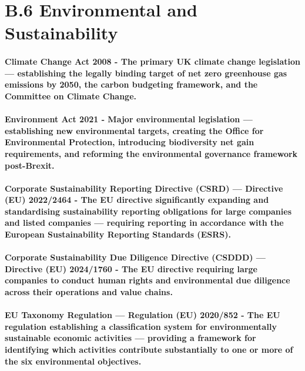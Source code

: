 \section*{B.6 Environmental and Sustainability}
\paragraph{\textbf{Climate Change Act 2008} - The primary UK climate change legislation — establishing the legally binding target of net zero greenhouse gas emissions by 2050, the carbon budgeting framework, and the Committee on Climate Change.}
\paragraph{\textbf{Environment Act 2021} - Major environmental legislation — establishing new environmental targets, creating the Office for Environmental Protection, introducing biodiversity net gain requirements, and reforming the environmental governance framework post-Brexit.}
\paragraph{\textbf{Corporate Sustainability Reporting Directive (CSRD) — Directive (EU) 2022/2464} - The EU directive significantly expanding and standardising sustainability reporting obligations for large companies and listed companies — requiring reporting in accordance with the European Sustainability Reporting Standards (ESRS).}
\paragraph{\textbf{Corporate Sustainability Due Diligence Directive (CSDDD) — Directive (EU) 2024/1760} - The EU directive requiring large companies to conduct human rights and environmental due diligence across their operations and value chains.}
\paragraph{\textbf{EU Taxonomy Regulation — Regulation (EU) 2020/852} - The EU regulation establishing a classification system for environmentally sustainable economic activities — providing a framework for identifying which activities contribute substantially to one or more of the six environmental objectives.}

